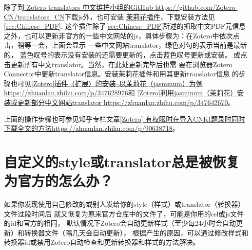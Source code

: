 \documentclass[cn,11pt,chinese]{elegantbook}
\begin{document}
				除了到\href{https://github.com/Zotero-CN/translators_CN}{ Zotero translators 
				中文维护小组的GitHub 
				\url{ https://github.com/Zotero-CN/translators_CN}}下载js外，也可安装
				\href{https://github.com/l0o0/jasminum/releases}{茉莉花插件}，下载安装方法见
				\cref{sec:Chinese_PDF}, 这个插件除了\cref{sec:Chinese_PDF}所述的抓取中文PDF元信息
				之外，也可以更新非官方的一些中文网站的js，具体步骤为：在Zotero中依次点击，稍等一会，上面会显示
				一些中文网站translator，绿色对勾的表示当前是最新的，
				蓝色叹号的表示没有安装的还需要更新的，点击蓝色叹号更新或安装。
				或点击更新所有中文translator。当然，在此处更新完毕后也需
				要在浏览器Zotero Connector中更新translator信息。安装茉莉花插件和用其更新translator信息
				的步骤也可见\href{https://zhuanlan.zhihu.com/p/347628976}
				{[Zotero]插件（扩展）的安装--以茉莉花（jasminum）为例
				\url{https://zhuanlan.zhihu.com/p/347628976}}和
				\href{https://zhuanlan.zhihu.com/p/347642670}
				{[Zotero]利用jasminum（茉莉花）安装或更新部分中文网站translator
				\url{https://zhuanlan.zhihu.com/p/347642670}}。


			上面的操作步骤也可参见知乎专栏文章\href{https://zhuanlan.zhihu.com/p/90638718}{[Zotero]
			有权限时在导入CNKI题录时同时下载全文的方法\url{https://zhuanlan.zhihu.com/p/90638718}}。

		\section{自定义的style或translator总是被恢复为官方的怎么办？}\label{sec:reset_style}
			如果你发现使用自己修改的或别人发给你的style（样式）或translator（转换器）文件过段时间后
			就又恢复为原来官方仓库中的文件了，可能是你用的csl或js文件的id和官方的相同，
			默认情况下Zotero会自动更新样式（至少每24小时会自动更新）和转换器文件（隔几天会自动更新），
			根据产生的原因，可以通过修改样式和转换器id或禁用Zotero自动检查和更新转换器和样式的方法解决。
\end{document}
